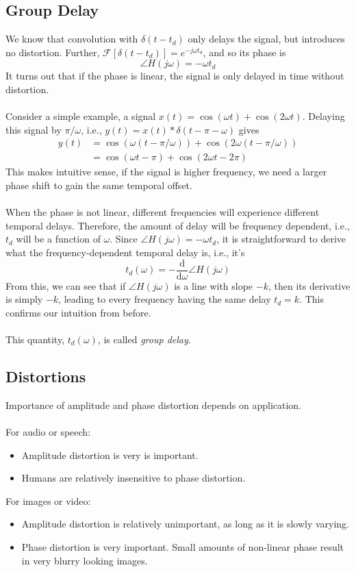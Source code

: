 \documentclass[10pt]{article}
\newcommand{\fourier}{\mathcal{F}}
\newcommand{\dd}{\text{d}}
\begin{document}
\subsection*{Group Delay}
We know that convolution with $\delta(t - t_d)$ only delays the signal, but introduces no distortion.  Further, $\fourier[\delta(t - t_d)] = e^{-j\omega t_d}$, and so its phase is
\[\angle H(j\omega) = -\omega t_d\]
It turns out that if the phase is linear, the signal is only delayed in time without distortion.\\\\
Consider a simple example, a signal $x(t) = \cos(\omega t) + \cos(2\omega t)$.  Delaying this signal by $\pi / \omega$, i.e., $y(t) = x(t) * \delta(t - \pi - \omega)$ gives
\begin{align*}
    y(t) &= \cos(\omega(t - \pi/\omega)) + \cos(2\omega(t - \pi / \omega))\\
    &= \cos(\omega t - \pi) + \cos(2\omega t - 2\pi)
\end{align*}
This makes intuitive sense, if the signal is higher frequency, we need a larger phase shift to gain the same temporal offset.\\\\
When the phase is not linear, different frequencies will experience different temporal delays.  Therefore, the amount of delay will be frequency dependent, i.e., $t_d$ will be a function of $\omega$.  Since $\angle H(j\omega) = -\omega t_d$, it is straightforward to derive what the frequency-dependent temporal delay is, i.e., it's
\[t_d(\omega) = -\frac{\dd}{\dd \omega} \angle H(j\omega)\]
From this, we can see that if $\angle H(j\omega)$ is a line with slope $-k$, then its derivative is simply $-k$, leading to every frequency having the same delay $t_d = k$.  This confirms our intuition from before.\\\\
This quantity, $t_d(\omega)$, is called \textit{group delay}.
\subsection*{Distortions}
Importance of amplitude and phase distortion depends on application.\\\\
For audio or speech:
\begin{itemize}
    \item Amplitude distortion is very is important.
    \item Humans are relatively insensitive to phase distortion.
\end{itemize}
For images or video:
\begin{itemize}
    \item Amplitude distortion is relatively unimportant, as long as it is slowly varying.
    \item Phase distortion is very important.  Small amounts of non-linear phase result in very blurry looking images.
\end{itemize}
\end{document}
